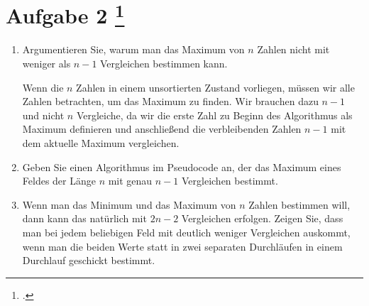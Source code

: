 \documentclass{lehramt-informatik-aufgabe}
\begin{document}
\section{Aufgabe 2
\footcite{66115:2021:03}}

\begin{enumerate}


\item Argumentieren Sie, warum man das Maximum von $n$ Zahlen nicht mit
weniger als $n - 1$ Vergleichen bestimmen kann.

\begin{liAntwort}
Wenn die $n$ Zahlen in einem unsortierten Zustand vorliegen, müssen wir
alle Zahlen betrachten, um das Maximum zu finden. Wir brauchen dazu $n -
1$ und nicht $n$ Vergleiche, da wir die erste Zahl zu Beginn des
Algorithmus als Maximum definieren und anschließend die verbleibenden
Zahlen $n - 1$ mit dem aktuelle Maximum vergleichen.
\end{liAntwort}


\item Geben Sie einen Algorithmus im Pseudocode an, der das Maximum
eines Feldes der Länge $n$ mit genau $n - 1$ Vergleichen bestimmt.

\begin{liAntwort}
\end{liAntwort}


\item Wenn man das Minimum und das Maximum von $n$ Zahlen bestimmen
will, dann kann das natürlich mit $2n - 2$ Vergleichen erfolgen. Zeigen
Sie, dass man bei jedem beliebigen Feld mit deutlich weniger Vergleichen
auskommt, wenn man die beiden Werte statt in zwei separaten Durchläufen
in einem Durchlauf geschickt bestimmt.

\begin{liAntwort}
\end{liAntwort}

\end{enumerate}
\end{document}
